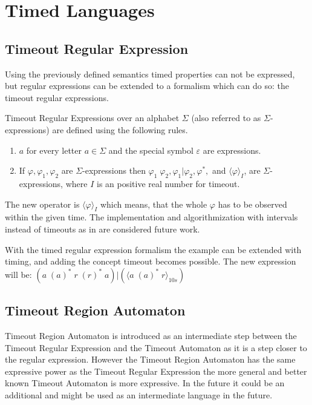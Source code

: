 			
	\section{Timed Languages}	
		\subsection{Timeout Regular Expression}
	
		Using the previously defined semantics timed properties can not be expressed, but regular expressions can be extended to a formalism which can do so: the timeout regular expressions.
		\begin{dfn}
			\label{dfn:cep:tre}
			Timeout Regular Expressions over an alphabet $\Sigma$ (also referred to as $\Sigma$-expressions)
			are defined using the following rules.
			\begin{enumerate}
				\item $a$ for every letter $a \in \Sigma$ and the special symbol $\varepsilon$ are expressions.
				\item If $\varphi, \varphi_1, \varphi_2$ are $\Sigma$-expressions then %
					$ %
					\varphi_1 \; \varphi_2,
					\varphi_1 | \varphi_2,
					\varphi^\ast,$ and 
					$\langle \varphi \rangle_I$, 
					are $\Sigma$-expressions, where $I$ is an positive real number for timeout. %
			\end{enumerate}
		\end{dfn}

		The new operator is $\langle \varphi \rangle_I$ which means, that the whole $\varphi$ has to be observed within the given time.	
		The implementation and algorithmization with intervals instead of timeouts as in \citep{tre} are considered future work.

		With the timed regular expression formalism the example can be extended with timing, and adding the concept timeout becomes possible.
		The new expression will be: $(a \; (a)^\ast \; r \; (r)^\ast \; a)|( \langle a \; (a)^\ast \; r \rangle_{10 s})$
		
		\subsection{Timeout Region Automaton}
		
		Timeout Region Automaton is introduced as an intermediate step between the Timeout Regular Expression and the Timeout Automaton as it is a step closer to the regular expression.
		However the Timeout Region Automaton has the same expressive power as the Timeout Regular Expression the more general and better known Timeout Automaton is more expressive. In the future it could be an additional  and might be used as an intermediate language in the future.
		
